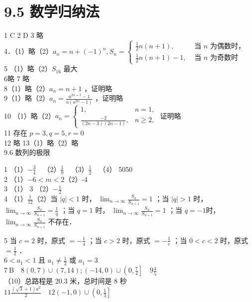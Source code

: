 \documentclass[10pt]{article}
\begin{document}
\section*{9.5 数学归纳法}
1 C 2 D 3 略\\
4．（1）略（2）\(a_{n}=n+(-1)^{n}, S_{n}= \begin{cases}\frac{1}{2} n(n+1), & \text { 当 } n \text { 为偶数时，} \\ \frac{1}{2} n(n+1)-1, & \text { 当 } n \text { 为奇数时 }\end{cases}\)\\
5 （1）略（2）\(S_{16}\) 最大\\
6略 7 略\\
8（1）略（2）\(a_{n}=n+1\) ，证明略\\
9（1）略（2）\(a_{n}=\frac{a^{2 n+2}-1}{a\left(a^{2 n}-1\right)}\) ，证明略\\
10 （1）略（2）\(a_{n}=\left\{\begin{array}{ll}1, & n=1, \\ \frac{-2}{(2 n-3)(2 n-1)}, & n \geqslant 2,\end{array}\right.\) 证明略\\
11 存在 \(p=3, q=5, r=0\)\\
12 略 13（1）略（2）略\\
9.6 数列的极限

1 （1）\(-\frac{3}{4} \quad\)（2）\(\frac{1}{9} \quad\)（3）\(\frac{1}{2} \quad\)（4） 5050\\
2 （1）\(-6<m<2\)（2）-4\\
3 （1） 3 （2）\(-\frac{1}{2}\)\\
4 （1）\(\frac{1}{12}\)（2）当 \(|q|<1\) 时， \(\lim _{n \rightarrow \infty} \frac{S_{n}}{S_{n+1}}=1\) ；当 \(|q|>1\) 时， \(\lim _{n \rightarrow \infty} \frac{S_{n}}{S_{n+1}}=\frac{1}{q}\) ；当 \(q=1\) 时， \(\lim _{n \rightarrow \infty} \frac{S_{n}}{S_{n+1}}=1\) ；当 \(q=-1\)时， \(\lim _{n \rightarrow \infty} \frac{S_{n}}{S_{n+1}}\) 不存在．

5 当 \(c=2\) 时，原式 \(=-\frac{1}{4}\) ；当 \(c>2\) 时，原式 \(=-\frac{1}{c}\) ；当 \(0<c<2\) 时，原式 \(=\frac{1}{2}\) ．\\
\(6<a_{1}<1\) 且 \(a_{1} \neq \frac{1}{2}\) 或 \(a_{1}=3\)\\
\(7 \mathrm{~B} \quad 8(0,7) \cup(7,14) ;(-14,0) \cup\left(0, \frac{7}{4}\right] \quad 9 \frac{4}{5}\)\\
（10）总路程是 20.3 米，总时间是 8 秒\\
\(11 \frac{(\sqrt{3}+1) a^{2}}{2} \quad 12(-1,0) \cup\left(0, \frac{1}{3}\right]\)
\end{document}
